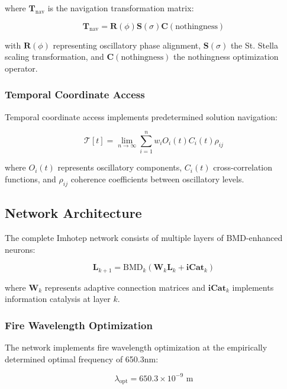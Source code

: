 \documentclass[12pt,a4paper]{article}
\theoremstyle{remark}
\begin{document}
where $\mathbf{T}_{\text{nav}}$ is the navigation transformation matrix:

\begin{equation}
\mathbf{T}_{\text{nav}} = \mathbf{R}(\phi) \mathbf{S}(\sigma) \mathbf{C}(\text{nothingness})
\end{equation}

with $\mathbf{R}(\phi)$ representing oscillatory phase alignment, $\mathbf{S}(\sigma)$ the St. Stella scaling transformation, and $\mathbf{C}(\text{nothingness})$ the nothingness optimization operator.

\subsubsection{Temporal Coordinate Access}

Temporal coordinate access implements predetermined solution navigation:

\begin{equation}
\mathcal{T}[t] = \lim_{n \to \infty} \sum_{i=1}^{n} w_i O_i(t) C_i(t) \rho_{ij}
\end{equation}

where $O_i(t)$ represents oscillatory components, $C_i(t)$ cross-correlation functions, and $\rho_{ij}$ coherence coefficients between oscillatory levels.

\subsection{Network Architecture}

The complete Imhotep network consists of multiple layers of BMD-enhanced neurons:

\begin{equation}
\mathbf{L}_{k+1} = \text{BMD}_k\left(\mathbf{W}_k \mathbf{L}_k + \mathbf{iCat}_k\right)
\end{equation}

where $\mathbf{W}_k$ represents adaptive connection matrices and $\mathbf{iCat}_k$ implements information catalysis at layer $k$.

\subsubsection{Fire Wavelength Optimization}

The network implements fire wavelength optimization at the empirically determined optimal frequency of 650.3nm:

\begin{equation}
\lambda_{\text{opt}} = 650.3 \times 10^{-9} \text{ m}
\end{equation}
\end{document}
